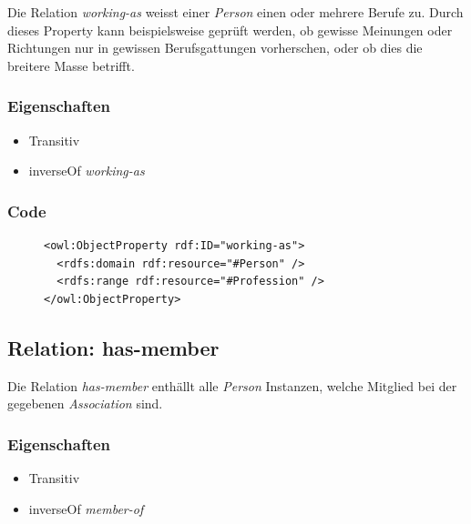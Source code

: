 \documentclass[
    11pt,
    latin1,
    a4paper,
    oneside
]{scrreprt}
\begin{document}
Die Relation \emph{working-as} weisst einer \emph{Person} einen oder mehrere Berufe zu. Durch dieses Property kann beispielsweise gepr\"uft werden, ob gewisse Meinungen oder Richtungen nur in gewissen Berufsgattungen vorherschen, oder ob dies die breitere Masse betrifft.

\subsubsection{Eigenschaften} \label{sec:rel_workingas_settings}

\begin{itemize}
  \item Transitiv
  \item inverseOf \emph{working-as}
\end{itemize}

\subsubsection{Code} \label{sec:rel_workingas_code}

\begin{figure}[H]
 \lstset{language=XML}
 \begin{lstlisting}[label=owl:workingas,caption={Die Relation \emph{working-as} gibt an, welchen Beruf eine Person aus\"ubt}]
<owl:ObjectProperty rdf:ID="working-as">
  <rdfs:domain rdf:resource="#Person" />
  <rdfs:range rdf:resource="#Profession" />
</owl:ObjectProperty>
 \end{lstlisting}
\end{figure}


\subsection{Relation: has-member} \label{sec:rel_hasmember}

Die Relation \emph{has-member} enth\"allt alle \emph{Person} Instanzen, welche Mitglied bei der gegebenen \emph{Association} sind.

\subsubsection{Eigenschaften} \label{sec:rel_hasmember_settings}

\begin{itemize}
  \item Transitiv
  \item inverseOf \emph{member-of}
\end{itemize}
\end{document}

